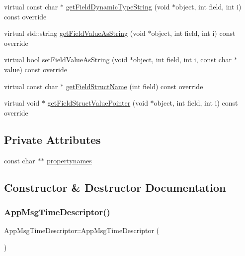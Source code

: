 \begin{DoxyCompactItemize}
\item 
virtual const char $\ast$ \hyperlink{classAppMsgTimeDescriptor_a8e410f5a62c300aae0066bc7c979d953}{get\+Field\+Dynamic\+Type\+String} (void $\ast$object, int field, int i) const override
\item 
virtual std\+::string \hyperlink{classAppMsgTimeDescriptor_adfd92cca9d3fdd2705e303d1f5121c07}{get\+Field\+Value\+As\+String} (void $\ast$object, int field, int i) const override
\item 
virtual bool \hyperlink{classAppMsgTimeDescriptor_abb26d4a890c0ec9753b49970adfd597c}{set\+Field\+Value\+As\+String} (void $\ast$object, int field, int i, const char $\ast$value) const override
\item 
virtual const char $\ast$ \hyperlink{classAppMsgTimeDescriptor_a0b91efc1f981d4594f4361e9dab2dd49}{get\+Field\+Struct\+Name} (int field) const override
\item 
virtual void $\ast$ \hyperlink{classAppMsgTimeDescriptor_a974b4e6fe474d1a56870c30030efe18d}{get\+Field\+Struct\+Value\+Pointer} (void $\ast$object, int field, int i) const override
\end{DoxyCompactItemize}
\subsection*{Private Attributes}
\begin{DoxyCompactItemize}
\item 
const char $\ast$$\ast$ \hyperlink{classAppMsgTimeDescriptor_a102cbf09a1ba7e40df81cca8c3c503b4}{propertynames}
\end{DoxyCompactItemize}


\subsection{Constructor \& Destructor Documentation}
\mbox{\label{classAppMsgTimeDescriptor_aa1c0a48d43a21f17d556759173b321b5}} 
\subsubsection{\texorpdfstring{App\+Msg\+Time\+Descriptor()}{AppMsgTimeDescriptor()}}
{\footnotesize\ttfamily App\+Msg\+Time\+Descriptor\+::\+App\+Msg\+Time\+Descriptor (\begin{DoxyParamCaption}{ }\end{DoxyParamCaption})}

